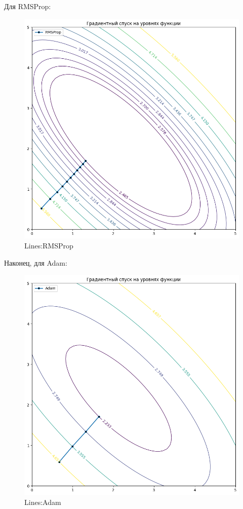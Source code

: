 \documentclass[12pt, a4paper, oneside, final]{article}
\begin{document}
	Для RMSProp:
	\begin{figure}[H]
		\centering
		\includegraphics[scale = 0.6]{Image/T5_LINES_RMSPROP.png}
		\caption*{Lines:RMSProp}
	\end{figure}\newpage
	Наконец, для Adam:
	\begin{figure}[H]
		\centering
		\includegraphics[scale = 0.6]{Image/T5_LINES_ADAM.png}
		\caption*{Lines:Adam}
	\end{figure}
	\newpage
\end{document}
